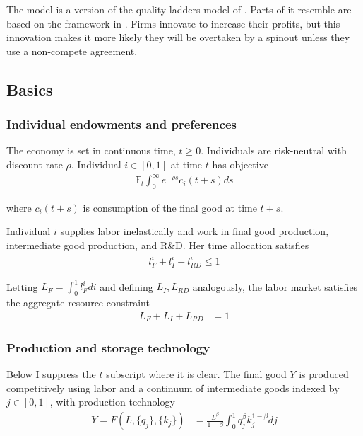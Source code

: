\documentclass[12pt,english]{article}
\theoremstyle{remark}
\begin{document}
The model is a version of the quality ladders model of \cite{grossman_quality_1991}. Parts of it resemble are based on the framework in \cite{akcigit_growth_2018}. Firms innovate to increase their profits, but this innovation makes it more likely they will be overtaken by a spinout unless they use a non-compete agreement.

\subsection{Basics}

\subsubsection{Individual endowments and preferences}

The economy is set in continuous time, $t \ge 0$. Individuals are risk-neutral with discount rate $\rho$. Individual $i \in [0,1]$ at time $t$ has objective
\begin{align*}
\mathbb{E}_t \int_0^{\infty} e^{-\rho s} c_i(t+s) ds
\end{align*}

where $c_i(t+s)$ is consumption of the final good at time $t+s$.

Individual $i$ supplies labor inelastically and work in final good production, intermediate good production, and R\&D. Her time allocation satisfies
\begin{align*}
l_F^i + l_I^i + l_{RD}^i \le 1
\end{align*}

Letting $L_F = \int_0^1 l_F^i di$ and defining $L_I,L_{RD}$ analogously, the labor market satisfies the aggregate resource constraint
\begin{align}
L_F + L_I + L_{RD} &= 1 \label{labor_resource_constraint}
\end{align}

\subsubsection{Production and storage technology}

Below I suppress the $t$ subscript where it is clear. The final good $Y$ is produced competitively using labor and a continuum of intermediate goods indexed by $j \in [0,1]$, with production technology
\begin{align*}
Y = F(L,\{q_j\},\{k_j\}) &= \frac{L^{\beta}}{1-\beta} \int_0^1 q_j^{\beta} k_j^{1-\beta} dj
\end{align*}
\end{document}
